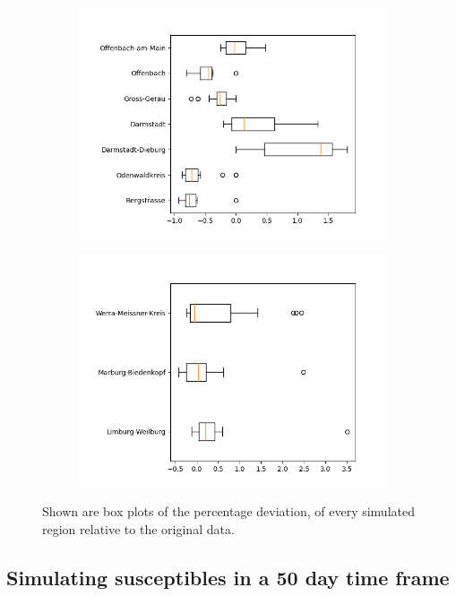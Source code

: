 \begin{figure}
\begin{subfigure}[b]{0.4\textwidth}
		\includegraphics[width=\textwidth]{./figures/60d/deviation_box60_alt3.png}	
	\end{subfigure}
	\begin{subfigure}[b]{0.4\textwidth}
		\centering
		\includegraphics[width=\textwidth]{./figures/60d/deviation_box60_alt4.png}	
	\end{subfigure}
	\caption{Shown are box plots of the percentage deviation, of every simulated region relative to the original data.}
	\label{fig:60_sim_box}
\end{figure}
\subsection{Simulating susceptibles in a 50 day time frame}

